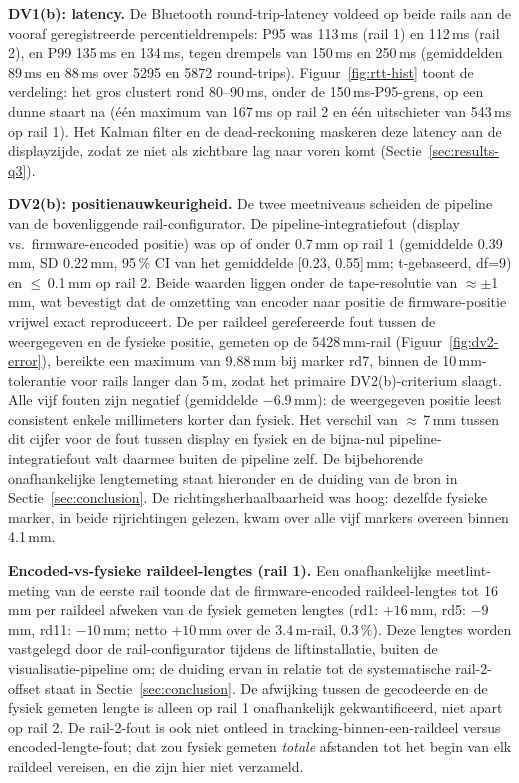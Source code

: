 \documentclass[10pt, a4paper, twocolumn]{article}
\begin{document}
\textbf{DV1(b): latency.} De Bluetooth round-trip-latency voldeed op beide rails
aan de vooraf geregistreerde percentieldrempels: P95 was 113\,ms (rail 1) en
112\,ms (rail 2), en P99 135\,ms en 134\,ms, tegen drempels van 150\,ms en
250\,ms (gemiddelden 89\,ms en 88\,ms over 5295 en 5872 round-trips).
Figuur~\ref{fig:rtt-hist} toont de verdeling: het gros clustert rond 80--90\,ms,
onder de 150\,ms-P95-grens, op een dunne staart na (één maximum van 167\,ms op
rail 2 en één uitschieter van 543\,ms op rail 1). Het Kalman filter en de
dead-reckoning maskeren deze latency aan de displayzijde, zodat ze niet als
zichtbare lag naar voren komt (Sectie~\ref{sec:results-q3}).



\textbf{DV2(b): positienauwkeurigheid.} De twee meetniveaus scheiden de pipeline
van de bovenliggende rail-configurator. De pipeline-integratiefout (display
vs.\ firmware-encoded positie) was op of onder 0.7\,mm op rail 1 (gemiddelde
0.39\,mm, SD 0.22\,mm, 95\,\% CI van het gemiddelde [0.23, 0.55]\,mm;
t-gebaseerd, df=9) en $\leq$\,0.1\,mm op rail 2. Beide waarden liggen onder de tape-resolutie
van $\approx\pm$1\,mm, wat bevestigt dat de omzetting van encoder naar positie de
firmware-positie vrijwel exact reproduceert. De per raildeel gerefereerde fout tussen de
weergegeven en de fysieke positie, gemeten op de 5428\,mm-rail (Figuur~\ref{fig:dv2-error}), bereikte een
maximum van 9.88\,mm bij marker rd7, binnen de 10\,mm-tolerantie voor rails
langer dan 5\,m, zodat het primaire DV2(b)-criterium slaagt. Alle vijf fouten
zijn negatief (gemiddelde $-6.9$\,mm): de weergegeven positie leest consistent
enkele millimeters korter dan fysiek. Het verschil van $\approx$\,7\,mm tussen
dit cijfer voor de fout tussen display en fysiek en de bijna-nul pipeline-integratiefout valt
daarmee buiten de pipeline zelf. De bijbehorende onafhankelijke lengtemeting
staat hieronder en de duiding van de bron in Sectie~\ref{sec:conclusion}.
De richtingsherhaalbaarheid was hoog: dezelfde fysieke marker, in beide
rijrichtingen gelezen, kwam over alle vijf markers overeen binnen 4.1\,mm.



\textbf{Encoded-vs-fysieke raildeel-lengtes (rail 1).} Een onafhankelijke
meetlint-meting van de eerste rail toonde dat de firmware-encoded
raildeel-lengtes tot 16\,mm per raildeel afweken van de fysiek gemeten lengtes
(rd1: $+16$\,mm, rd5: $-9$\,mm, rd11: $-10$\,mm; netto $+10$\,mm over de
3.4\,m-rail, 0.3\,\%). Deze lengtes worden vastgelegd door de
rail-configurator tijdens de liftinstallatie, buiten de
visualisatie-pipeline om; de duiding ervan in relatie tot de systematische
rail-2-offset staat in Sectie~\ref{sec:conclusion}. De afwijking tussen de
gecodeerde en de fysiek gemeten lengte is alleen op rail 1 onafhankelijk gekwantificeerd, niet apart op rail
2. De rail-2-fout is ook niet ontleed in tracking-binnen-een-raildeel versus
encoded-lengte-fout; dat zou fysiek gemeten \emph{totale} afstanden tot het
begin van elk raildeel vereisen, en die zijn hier niet verzameld.
\end{document}
